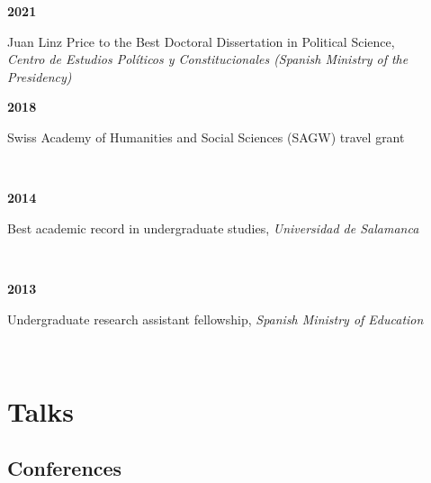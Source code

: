 \documentclass[a4paper, 12pt]{article}
\begin{document}
\begin{minipage}[t]{0.1\textwidth}
\textbf{2021}
\end{minipage}\hfill\begin{minipage}[t]{0.9\textwidth}
Juan Linz Price to the Best Doctoral Dissertation in Political Science,\\\textit{Centro de Estudios Políticos y Constitucionales (Spanish Ministry of the Presidency)}\\\vspace{-8pt}
\end{minipage}
\begin{minipage}[t]{0.1\textwidth}
\textbf{2018}
\end{minipage}\hfill\begin{minipage}[t]{0.9\textwidth}
Swiss Academy of Humanities and Social Sciences (SAGW) travel grant
\end{minipage}\\
\begin{minipage}[t]{0.1\textwidth}
\textbf{2014}
\end{minipage}\hfill\begin{minipage}[t]{0.9\textwidth}
Best academic record in undergraduate studies, {\it Universidad de Salamanca}
\end{minipage}\\
\begin{minipage}[t]{0.1\textwidth}
\textbf{2013}
\end{minipage}\hfill\begin{minipage}[t]{0.9\textwidth}
Undergraduate research assistant fellowship, {\it Spanish Ministry of Education}
\end{minipage}\\

\section*{Talks}

\subsection*{Conferences}

\end{document}
